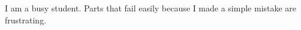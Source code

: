 I am a busy student.  Parts that fail easily because I made a simple mistake are frustrating.
\bigskip